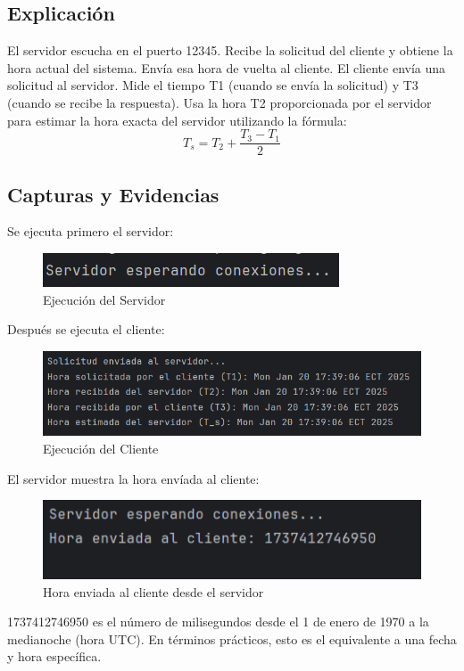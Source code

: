 \documentclass[a4paper,12pt]{report}
\begin{document}
\subsection{Explicación}
El servidor escucha en el puerto 12345.
Recibe la solicitud del cliente y obtiene la hora actual del sistema.
Envía esa hora de vuelta al cliente.
El cliente envía una solicitud al servidor.
Mide el tiempo T1 (cuando se envía la solicitud) y T3 (cuando se recibe la respuesta).
Usa la hora T2 proporcionada por el servidor para estimar la hora exacta del servidor utilizando la fórmula: \[
T_s = T_2 + \frac{T_3 - T_1}{2}
\]
\subsection{Capturas y Evidencias}
Se ejecuta primero el servidor:
\begin{figure} [H]
    \centering
    \includegraphics[width=1\linewidth]{images/server1.png}
    \caption{Ejecución del Servidor}
    \label{fig:enter-label}
\end{figure}
Después se ejecuta el cliente:
\begin{figure} [H]
    \centering
    \includegraphics[width=1\linewidth]{images/client1.png}
    \caption{Ejecución del Cliente}
    \label{fig:enter-label}
\end{figure}
El servidor muestra la hora envíada al cliente:
\begin{figure} [H]
    \centering
    \includegraphics[width=1\linewidth]{images/servidor2.png}
    \caption{Hora enviada al cliente desde el servidor}
    \label{fig:enter-label}
\end{figure}
1737412746950 es el número de milisegundos desde el 1 de enero de 1970 a la medianoche (hora UTC). En términos prácticos, esto es el equivalente a una fecha y hora específica.
\end{document}
